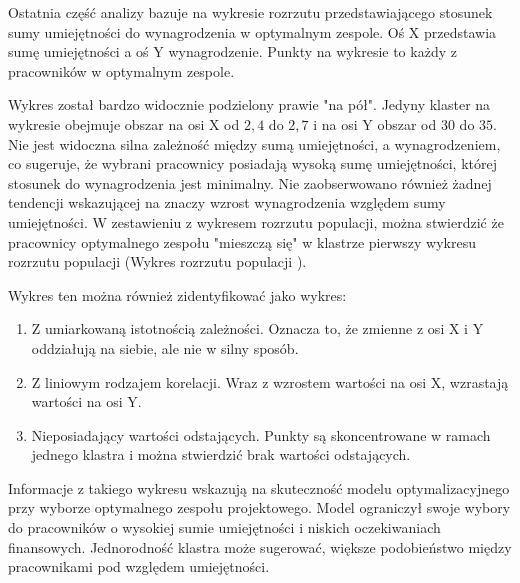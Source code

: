     \par Ostatnia część analizy bazuje na wykresie rozrzutu przedstawiającego stosunek sumy umiejętności do wynagrodzenia w optymalnym zespole. Oś X przedstawia sumę umiejętności a oś Y wynagrodzenie. Punkty na wykresie to każdy z pracowników w optymalnym zespole.

    \par Wykres został bardzo widocznie podzielony prawie "na pół". Jedyny klaster na wykresie obejmuje obszar na osi X od $2,4$ do $2,7$ i na osi Y obszar od $30$ do $35$. Nie jest widoczna silna zależność między sumą umiejętności, a wynagrodzeniem, co sugeruje, że wybrani pracownicy posiadają wysoką sumę umiejętności, której stosunek do wynagrodzenia jest minimalny. Nie zaobserwowano również żadnej tendencji wskazującej na znaczy wzrost wynagrodzenia względem sumy umiejętności. W zestawieniu z wykresem rozrzutu populacji, można stwierdzić że pracownicy optymalnego zespołu "mieszczą się" w klastrze pierwszy wykresu rozrzutu populacji (Wykres rozrzutu populacji ).

    \par Wykres ten można również zidentyfikować jako wykres:
    \begin{enumerate}
        \item Z umiarkowaną istotnością zależności. Oznacza to, że zmienne z osi X i Y oddziałują na siebie, ale nie w silny sposób.
        \item Z liniowym rodzajem korelacji. Wraz z wzrostem wartości na osi X, wzrastają wartości na osi Y.
        \item Nieposiadający wartości odstających. Punkty są skoncentrowane w ramach jednego klastra i można stwierdzić brak wartości odstających.
    \end{enumerate}

    \par Informacje z takiego wykresu wskazują na skuteczność modelu optymalizacyjnego przy wyborze optymalnego zespołu projektowego. Model ograniczył swoje wybory do pracowników o wysokiej sumie umiejętności i niskich oczekiwaniach finansowych. Jednorodność klastra może sugerować, większe podobieństwo między pracownikami pod względem umiejętności.
